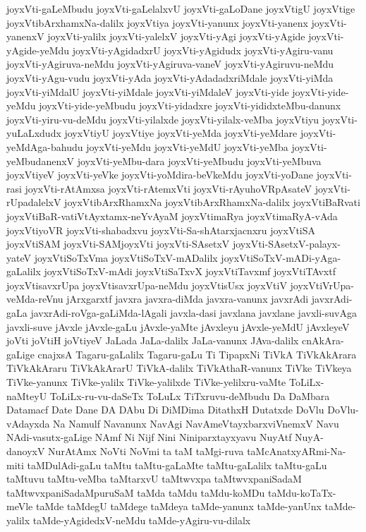 {joyxVti-gaLeMbudu
joyxVti-gaLelalxvU
joyxVti-gaLoDane
joyxVtigU
joyxVtige
joyxVtibArxhamxNa-dalilx
joyxVtiya
joyxVti-yanunx
joyxVti-yanenx
joyxVti-yanenxV
joyxVti-yalilx
joyxVti-yalelxV
joyxVti-yAgi
joyxVti-yAgide
joyxVti-yAgide-yeMdu
joyxVti-yAgidadxrU
joyxVti-yAgidudx
joyxVti-yAgiru-vanu
joyxVti-yAgiruva-neMdu
joyxVti-yAgiruva-vaneV
joyxVti-yAgiruvu-neMdu
joyxVti-yAgu-vudu
joyxVti-yAda
joyxVti-yAdadadxriMdale
joyxVti-yiMda
joyxVti-yiMdalU
joyxVti-yiMdale
joyxVti-yiMdaleV
joyxVti-yide
joyxVti-yide-yeMdu
joyxVti-yide-yeMbudu
joyxVti-yidadxre
joyxVti-yididxteMbu-danunx
joyxVti-yiru-vu-deMdu
joyxVti-yilalxde
joyxVti-yilalx-veMba
joyxVtiyu
joyxVti-yuLaLxdudx
joyxVtiyU
joyxVtiye
joyxVti-yeMda
joyxVti-yeMdare
joyxVti-yeMdAga-bahudu
joyxVti-yeMdu
joyxVti-yeMdU
joyxVti-yeMba
joyxVti-yeMbudanenxV
joyxVti-yeMbu-dara
joyxVti-yeMbudu
joyxVti-yeMbuva
joyxVtiyeV
joyxVti-yeVke
joyxVti-yoMdira-beVkeMdu
joyxVti-yoDane
joyxVti-rasi
joyxVti-rAtAmxsa
joyxVti-rAtemxVti
joyxVti-rAyuhoVRpAsateV
joyxVti-rUpadalelxV
joyxVtibArxRhamxNa
joyxVtibArxRhamxNa-dalilx
joyxVtiBaRvati
joyxVtiBaR-vatiVtAyxtamx-neYvAyaM
joyxVtimaRya
joyxVtimaRyA-vAda
joyxVtiyoVR
joyxVti-shabadxvu
joyxVti-Sa-shAtarxjacnxru
joyxVtiSA
joyxVtiSAM
joyxVti-SAMjoyxVti
joyxVti-SAsetxV
joyxVti-SAsetxV-palayx-yateV
joyxVtiSoTxVma
joyxVtiSoTxV-mADalilx
joyxVtiSoTxV-mADi-yAga-gaLalilx
joyxVtiSoTxV-mAdi
joyxVtiSaTxvX
joyxVtiTavxmf
joyxVtiTAvxtf
joyxVtisavxrUpa
joyxVtisavxrUpa-neMdu
joyxVtisUsx
joyxVtiV
joyxVtiVrUpa-veMda-reVnu
jArxgarxtf
javxra
javxra-diMda
javxra-vanunx
javxrAdi
javxrAdi-gaLa
javxrAdi-roVga-gaLiMda-lAgali
javxla-dasi
javxlana
javxlane
javxli-suvAga
javxli-suve
jAvxle
jAvxle-gaLu
jAvxle-yaMte
jAvxleyu
jAvxle-yeMdU
jAvxleyeV
joVti
joVtiH
joVtiyeV
JaLada
JaLa-dalilx
JaLa-vanunx
JAva-dalilx
cnAkAra-gaLige
cnajxsA
Tagaru-gaLalilx
Tagaru-gaLu
Ti
TipapxNi
TiVkA
TiVkAkArara
TiVkAkAraru
TiVkAkArarU
TiVkA-dalilx
TiVkAthaR-vanunx
TiVke
TiVkeya
TiVke-yanunx
TiVke-yalilx
TiVke-yalilxde
TiVke-yelilxru-vaMte
ToLiLx-naMteyU
ToLiLx-ru-vu-daSeTx
ToLuLx
TiTxruvu-deMbudu
Da
DaMbara
Datamacf
Date
Dane
DA
DAbu
Di
DiMDima
DitathxH
Dutatxde
DoVlu
DoVlu-vAdayxda
Na
Namulf
Navanunx
NavAgi
NavAmeVtayxbarxviVnemxV
Navu
NAdi-vasutx-gaLige
NAmf
Ni
Nijf
Nini
Niniparxtayxyavu
NuyAtf
NuyA-danoyxV
NurAtAmx
NoVti
NoVmi
ta
taM
taMgi-ruva
taMcAnatxyARmi-Na-miti
taMDulAdi-gaLu
taMtu
taMtu-gaLaMte
taMtu-gaLalilx
taMtu-gaLu
taMtuvu
taMtu-veMba
taMtarxvU
taMtwvxpa
taMtwvxpaniSadaM
taMtwvxpaniSadaMpuruSaM
taMda
taMdu
taMdu-koMDu
taMdu-koTaTx-meVle
taMde
taMdegU
taMdege
taMdeya
taMde-yanunx
taMde-yanUnx
taMde-yalilx
taMde-yAgidedxV-neMdu
taMde-yAgiru-vu-dilalx
}

